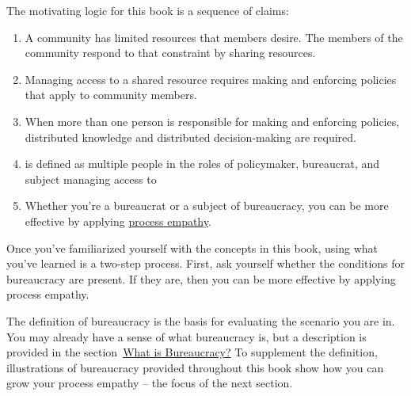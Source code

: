 The motivating logic for this book is a sequence of claims:
\begin{enumerate}
    \item A community has limited resources that members desire. The members of the community respond to that constraint by sharing resources.
    \item Managing access to a \gls{shared resource} 
    \iftoggle{glossaryinmargin}{\marginpar{[Glossary]}}{}%
    requires making and enforcing policies that apply to community members. 
    \item When more than one person is responsible for making and enforcing policies, distributed knowledge and distributed decision-making are required. 
    \item 
\iftoggle{glossarysubstitutionworks}{\Gls{bureaucracy}}{Bureaucracy}%
\iftoggle{glossaryinmargin}{\marginpar{[Glossary]}}{} is defined as multiple people in the roles of policymaker, bureaucrat, and subject managing access to 
\iftoggle{glossarysubstitutionworks}{\glspl{shared resource}.}{shared resources.} 
    \item Whether you're a \gls{bureaucrat} 
    \iftoggle{glossaryinmargin}{\marginpar{[Glossary]}}{}%
    or a subject of bureaucracy, you can be more effective by applying \hyperref[sec:process-empathy]{process empathy}.
\end{enumerate}

Once you've familiarized yourself with the concepts in this book, using what you've learned is a two-step process. First, ask yourself whether the conditions for bureaucracy are present. If they are, then you can be more effective by applying process empathy.

The definition of bureaucracy is the basis for evaluating the scenario you are in. You may already have a sense of what bureaucracy is, but a description is provided%
\iftoggle{haspagenumbers}{on page~\pageref{sec:define-bureaucracy}}{} 
in the section~\hyperref[sec:define-bureaucracy]{What is Bureaucracy?} To supplement the definition, illustrations of bureaucracy provided throughout this book show how you can grow your process empathy -- the focus of the next section. 